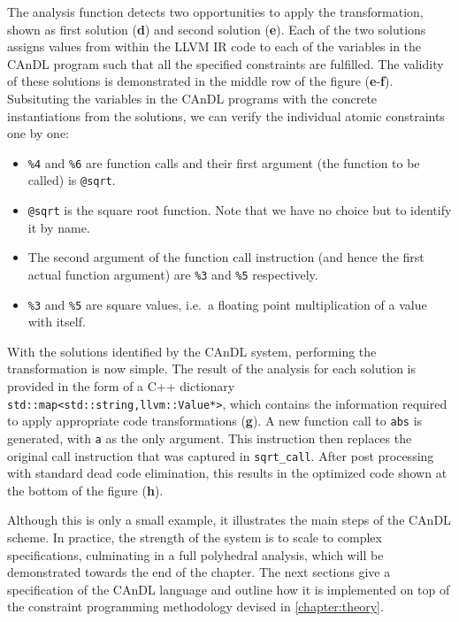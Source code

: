     The analysis function detects two opportunities to apply the transformation,
    shown as first solution ({\bf d}) and second solution ({\bf e}).
    Each of the two solutions assigns values from within the LLVM IR code to
    each of the variables in the CAnDL program such that all the specified
    constraints are fulfilled.
    The validity of these solutions is demonstrated in the middle row of the
    figure ({\bf e}-{\bf f}).
    Subsituting the variables in the CAnDL programs with the concrete
    instantiations from the solutions, we can verify the individual atomic
    constraints one by one:
    \begin{itemize}
    \item \texttt{\%4} and \texttt{\%6} are function calls and their first
          argument (the function to be called) is \texttt{@sqrt}.
    \item \texttt{@sqrt} is the square root function.
          Note that we have no choice but to identify it by name.
    \item The second argument of the function call instruction (and hence the
          first actual function argument) are \texttt{\%3} and \texttt{\%5}
          respectively.
    \item \texttt{\%3} and \texttt{\%5} are square values, i.e.\ a floating
          point multiplication of a value with itself.
    \end{itemize}

    With the solutions identified by the CAnDL system, performing the
    transformation is now simple.
    The result of the analysis for each solution is provided in the form of a
    C++ dictionary \texttt{std::map<std::string,llvm::Value*>}, which contains
    the information required to apply appropriate code transformations
    ({\bf g}).
    A new function call to \texttt{abs} is generated, with \texttt{a} as the
    only argument.
    This instruction then replaces the original call instruction that was
    captured in \texttt{sqrt\_call}.
    After post processing with standard dead code elimination, this results in
    the optimized code shown at the bottom of the figure ({\bf h}).

    Although this is only a small example, it illustrates the main steps of the
    CAnDL scheme.
    In practice, the strength of the system is to scale to complex
    specifications, culminating in a full polyhedral analysis, which will be
    demonstrated towards the end of the chapter.
    The next sections give a specification of the CAnDL language and outline how
    it is implemented on top of the constraint programming methodology devised
    in \autoref{chapter:theory}.

